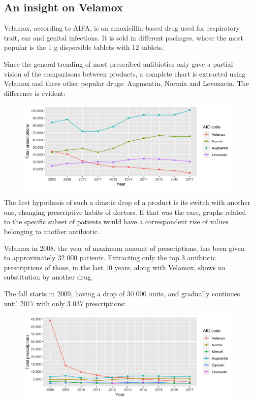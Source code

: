 \subsection{An insight on Velamox}
Velamox, according to AIFA, is an amoxicillin-based drug used for respiratory trait, ear and genital infections. It is sold in different packages, whose the most popular is the 1 g dispersible tablets with 12 tablets.

Since the general trending of most prescribed antibiotics only gave a partial vision of the comparisons between products, a complete chart is extracted using Velamox and three other popular drugs: Augmentin, Normix and Levoxacin. The difference is evident:

\begin{figure}[h]
	\centering
	\includegraphics[scale=0.3]{../plots/aic_4-year.png}
\end{figure}

The first hypothesis of such a drastic drop of a product is its switch with another one, changing prescriptive habits of doctors. If that was the case, graphs related to the specific subset of patients would have a correspondent rise of values belonging to another antibiotic.

Velamox in 2008, the year of maximum amount of prescriptions, has been given to approximately 32 000 patients. Extracting only the top 3 antibiotic prescriptions of those, in the last 10 years, along with Velamox, shows no substitution by another drug.

The fall starts in 2009, having a drop of 30 000 units, and gradually continues until 2017 with only 3 037 prescriptions:

\begin{figure}[h]
	\centering
	\includegraphics[scale=0.3]{../plots/top_aic_subset-year.png}
\end{figure}

